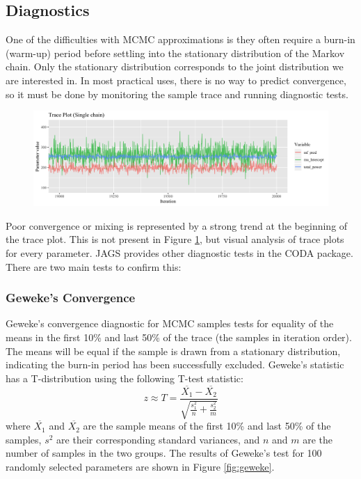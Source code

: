 \documentclass[a4paper, 12pt]{article}
\begin{document}
\subsection{Diagnostics}
One of the difficulties with MCMC approximations is they often require a burn-in (warm-up) period before settling into the stationary distribution of the Markov chain. Only the stationary distribution corresponds to the joint distribution we are interested in. In most practical uses, there is no way to predict convergence, so it must be done by monitoring the sample trace and running diagnostic tests.

\begin{figure}
\centering
  \includegraphics[width=\linewidth]{media/trace_plot}
  \label{fig:trace_plot}
\end{figure}

Poor convergence or mixing is represented by a strong trend at the beginning of the trace plot. This is not present in Figure \ref{fig:trace_plot}, but visual analysis of trace plots for every parameter.
JAGS provides other diagnostic tests in the CODA package. There are two main tests to confirm this:

\subsubsection{Geweke's Convergence}
Geweke's convergence diagnostic for MCMC samples tests for equality of the means in the first 10\% and last 50\% of the trace (the samples in iteration order). The means will be equal if the sample is drawn from a stationary distribution, indicating the burn-in period has been successfully excluded. Geweke's statistic has a T-distribution using the following T-test statistic:
\begin{equation}
z\approx T=\frac{\overline{X_1}-\overline{X_2}}{\sqrt{\frac{s_1^2}{n} + \frac{s_2^2}{m}}}
\end{equation}
where $\overline{X_1}$ and $\overline{X_2}$ are the sample means of the first 10\% and last 50\% of the samples, $s^2$ are their corresponding standard variances, and $n$ and $m$ are the number of samples in the two groups. The results of Geweke's test for 100 randomly selected parameters are shown in Figure \ref{fig:geweke}.
\end{document}
